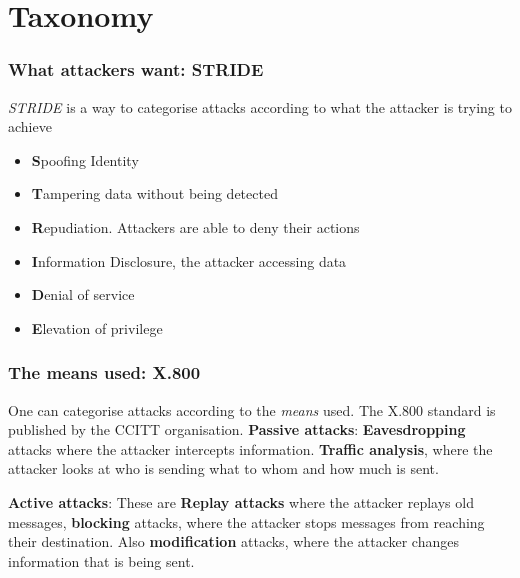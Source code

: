 \section{Taxonomy}
    \begin{frame}
        \frametitle{What attackers want: STRIDE}
            \textit{STRIDE} is a way to categorise attacks according to what the attacker is trying to achieve
            \begin{itemize}
                \item \textbf{S}poofing Identity
                \item \textbf{T}ampering data without being detected
                \item \textbf{R}epudiation. Attackers are able to deny their actions
                \item \textbf{I}nformation Disclosure, the attacker accessing data
                \item \textbf{D}enial of service
                \item \textbf{E}levation of privilege
            \end{itemize}
    \end{frame}
    \begin{frame}
        \frametitle{The means used: X.800}
            One can categorise attacks according to the \textit{means} used. The X.800 standard is published by the CCITT organisation.
            \textbf{Passive attacks}: \textbf{Eavesdropping} attacks where the attacker intercepts information. \textbf{Traffic analysis}, where the attacker looks at who is sending what to whom and how much is sent.
            
            \textbf{Active attacks}: These are \textbf{Replay attacks} where the attacker replays old messages, \textbf{blocking} attacks, where the attacker stops messages from reaching their destination. Also \textbf{modification} attacks, where the attacker changes information that is being sent. 
    \end{frame}
